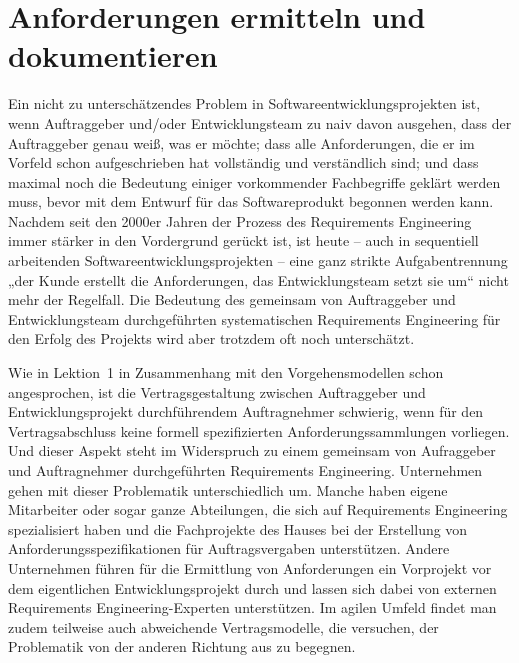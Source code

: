 \section{Anforderungen ermitteln und dokumentieren}
\label{sec:Kap-6.3}

Ein nicht zu unterschätzendes Problem in Softwareentwicklungsprojekten ist, wenn Auftraggeber und/oder Entwicklungsteam zu naiv davon ausgehen, dass der Auftrag\-geber genau weiß, was er möchte; dass alle Anforderungen, die er im Vorfeld schon aufgeschrieben hat vollständig und verständlich sind; und dass maximal noch die Bedeutung einiger vorkommender Fachbegriffe geklärt werden muss, bevor mit dem Entwurf für das Softwareprodukt begonnen werden kann. Nachdem seit den 2000er Jahren der Prozess des Requirements Engineering immer stärker in den Vordergrund gerückt ist, ist heute -- auch in sequentiell arbeitenden Software\-entwicklungs\-projekten -- eine ganz strikte Aufgabentrennung „der Kunde erstellt die Anforderungen, das Entwicklungsteam setzt sie um“ nicht mehr der Regelfall. Die Bedeutung des gemeinsam von Auftraggeber und Entwicklungsteam durchgeführten systema\-tischen Requirements Engineering für den Erfolg des Projekts wird aber trotzdem oft noch unterschätzt.

Wie in Lektion~1 %
in Zusammenhang mit den Vorgehensmodellen schon angesprochen, ist die Vertragsgestaltung zwischen Auftraggeber und Entwicklungsprojekt durchführendem Auftragnehmer schwierig, wenn für den Vertragsabschluss keine formell spezifizierten Anforderungssammlungen vorliegen. Und dieser Aspekt steht im Wider\-spruch zu einem gemeinsam von Aufraggeber und Auftragnehmer durchgeführten Requirements Engineering. Unternehmen gehen mit dieser Problematik unterschiedlich um. Manche haben eigene Mitarbeiter oder sogar ganze Abteilungen, die sich auf Requirements Engineering spezialisiert haben und die Fachprojekte des Hauses bei der Erstellung von Anforderungsspezifikationen für Auftragsvergaben unterstützen. Andere Unternehmen führen für die Ermittlung von Anforderungen ein Vorprojekt vor dem eigentlichen Entwicklungsprojekt durch und lassen sich dabei von externen Requirements Engineering-Experten unterstützen. Im agilen Umfeld findet man zudem teilweise auch abweichende Vertragsmodelle, die versuchen, der Problematik von der anderen Richtung aus zu begegnen.

